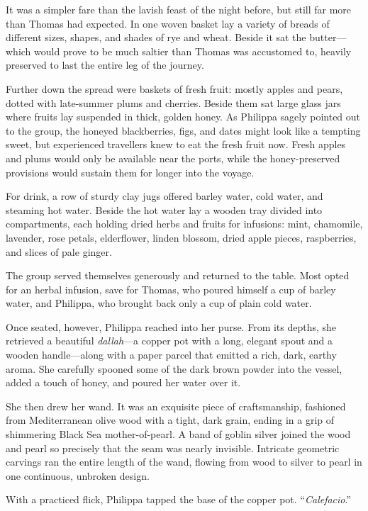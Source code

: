 It was a simpler fare than the lavish feast of the night before, but still far more than Thomas had expected. In one woven basket lay a variety of breads of different sizes, shapes, and shades of rye and wheat. Beside it sat the butter---which would prove to be much saltier than Thomas was accustomed to, heavily preserved to last the entire leg of the journey.

Further down the spread were baskets of fresh fruit: mostly apples and pears, dotted with late-summer plums and cherries. Beside them sat large glass jars where fruits lay suspended in thick, golden honey. As Philippa sagely pointed out to the group, the honeyed blackberries, figs, and dates might look like a tempting sweet, but experienced travellers knew to eat the fresh fruit now. Fresh apples and plums would only be available near the ports, while the honey-preserved provisions would sustain them for longer into the voyage.

For drink, a row of sturdy clay jugs offered barley water, cold water, and steaming hot water. Beside the hot water lay a wooden tray divided into compartments, each holding dried herbs and fruits for infusions: mint, chamomile, lavender, rose petals, elderflower, linden blossom, dried apple pieces, raspberries, and slices of pale ginger.

The group served themselves generously and returned to the table. Most opted for an herbal infusion, save for Thomas, who poured himself a cup of barley water, and Philippa, who brought back only a cup of plain cold water.

Once seated, however, Philippa reached into her purse. From its depths, she retrieved a beautiful \textit{dallah}---a copper pot with a long, elegant spout and a wooden handle---along with a paper parcel that emitted a rich, dark, earthy aroma. She carefully spooned some of the dark brown powder into the vessel, added a touch of honey, and poured her water over it.

She then drew her wand. It was an exquisite piece of craftsmanship, fashioned from Mediterranean olive wood with a tight, dark grain, ending in a grip of shimmering Black Sea mother-of-pearl. A band of goblin silver joined the wood and pearl so precisely that the seam was nearly invisible. Intricate geometric carvings ran the entire length of the wand, flowing from wood to silver to pearl in one continuous, unbroken design.

With a practiced flick, Philippa tapped the base of the copper pot. \enquote{\textit{Calefacio}.}

